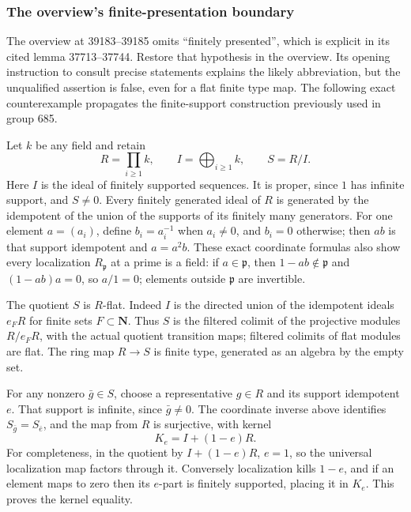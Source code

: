 \subsubsection{The overview's finite-presentation boundary}\label{the-overviews-finite-presentation-boundary}

The overview at 39183--39185 omits ``finitely presented'', which is explicit in its cited lemma 37713--37744. Restore that hypothesis in the overview. Its opening instruction to consult precise statements explains the likely abbreviation, but the unqualified assertion is false, even for a flat finite type map. The following exact counterexample propagates the finite-support construction previously used in group 685.

Let \(k\) be any field and retain \[
R=\prod_{i\ge1}k,\qquad I=\bigoplus_{i\ge1}k,\qquad S=R/I.
\] Here \(I\) is the ideal of finitely supported sequences. It is proper, since \(1\) has infinite support, and \(S\ne0\). Every finitely generated ideal of \(R\) is generated by the idempotent of the union of the supports of its finitely many generators. For one element \(a=(a_i)\), define \(b_i=a_i^{-1}\) when \(a_i\ne0\), and \(b_i=0\) otherwise; then \(ab\) is that support idempotent and \(a=a^2b\). These exact coordinate formulas also show every localization \(R_{\mathfrak p}\) at a prime is a field: if \(a\in\mathfrak p\), then \(1-ab\notin\mathfrak p\) and \((1-ab)a=0\), so \(a/1=0\); elements outside \(\mathfrak p\) are invertible.

The quotient \(S\) is \(R\)-flat. Indeed \(I\) is the directed union of the idempotent ideals \(e_FR\) for finite sets \(F\subset\mathbf N\). Thus \(S\) is the filtered colimit of the projective modules \(R/e_FR\), with the actual quotient transition maps; filtered colimits of flat modules are flat. The ring map \(R\to S\) is finite type, generated as an algebra by the empty set.

For any nonzero \(\bar g\in S\), choose a representative \(g\in R\) and its support idempotent \(e\). That support is infinite, since \(\bar g\ne0\). The coordinate inverse above identifies \(S_{\bar g}=S_{\bar e}\), and the map from \(R\) is surjective, with kernel \[
K_e=I+(1-e)R.
\] For completeness, in the quotient by \(I+(1-e)R\), \(e=1\), so the universal localization map factors through it. Conversely localization kills \(1-e\), and if an element maps to zero then its \(e\)-part is finitely supported, placing it in \(K_e\). This proves the kernel equality.

